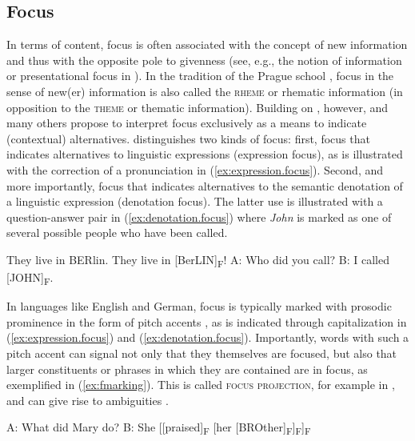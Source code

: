 \documentclass[output=paper,colorlinks,citecolor=brown]{langscibook}
\begin{document}
\subsection{Focus}\label{Intro:Sec:Focus}
In terms of content, focus is often associated with the concept of new information and thus with the opposite pole to givenness (see, e.g., the notion of information or presentational focus in \citealt{kiss1998}). In the tradition of the Prague school \citep[see e.g.][]{mathesius1975}, focus in the sense of new(er) information is also called the \textsc{rheme} or rhematic information (in opposition to the \textsc{theme} or thematic information). Building on \citet{rooth1985, rooth1992}, however, \citet{krifka2007} and many others propose to interpret focus exclusively as a means to indicate (contextual) alternatives.
\citet[20]{krifka2007} distinguishes two kinds of focus: first, focus that indicates alternatives to linguistic expressions (expression focus), as is illustrated with the correction of a pronunciation in (\ref{ex:expression.focus}). Second, and more importantly, focus that indicates alternatives to the semantic denotation of a linguistic expression (denotation focus). The latter use is illustrated with a question-answer pair in (\ref{ex:denotation.focus}) where \textit{John} is marked as one of several possible people who have been called.


\ea\label{ex:expression.focus}
    \ea They live in BERlin.
    \ex They live in [BerLIN]\textsubscript{F}!%
    \z
\ex\label{ex:denotation.focus}
    \ea A: Who did you call?
    \ex B: I called [JOHN]\textsubscript{F}.
    \z
\z

In languages like English and German, focus is typically marked with prosodic prominence in the form of pitch accents \citep[see e.g.][]{pierrehumbert1990}, as is indicated through capitalization in (\ref{ex:expression.focus}) and (\ref{ex:denotation.focus}).
Importantly, words with such a pitch accent can signal not only that they themselves are focused, but also that larger constituents or phrases in which they are contained are in focus, as exemplified in (\ref{ex:fmarking}).
This is called \textsc{focus projection}, for example in \citet{hohle1982}, and can give rise to ambiguities \citep{selkirk1984, selkirk1995}.
 
\ea\label{ex:fmarking} 
    \ea A: What did Mary do? 
    \ex B: She [[praised]\textsubscript{F} [her [BROther]\textsubscript{F}]\textsubscript{F}]\textsubscript{F}
    \z
\z
\end{document}
